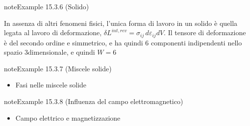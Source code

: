 \documentclass[letterpaper,10pt,italian]{jupyterBook}
\begin{document}
\label{ch/thermodynamics/principles-gibbs-phase-rule:example-9}
\begin{sphinxadmonition}{note}{Example 15.3.6 (Solido)}



\sphinxAtStartPar
In assenza di altri fenomeni fisici, l’unica forma di lavoro in un solido è quella legata al lavoro di deformazione, \(\delta L^{int,rev} = \sigma_{ij} \, d \varepsilon_{ij} dV\). Il tensore di deformazione è del secondo ordine e simmetrico, e ha quindi 6 componenti indipendenti nello spazio 3\sphinxhyphen{}dimensionale, e quindi \(W=6\)
\end{sphinxadmonition}
\label{ch/thermodynamics/principles-gibbs-phase-rule:example-10}
\begin{sphinxadmonition}{note}{Example 15.3.7 (Miscele solide)}


\begin{itemize}
\item {} 
\sphinxAtStartPar
Fasi nelle miscele solide 

\end{itemize}
\end{sphinxadmonition}
\label{ch/thermodynamics/principles-gibbs-phase-rule:example-11}
\begin{sphinxadmonition}{note}{Example 15.3.8 (Influenza del campo elettromagnetico)}


\begin{itemize}
\item {} 
\sphinxAtStartPar
Campo elettrico e magnetizzazione 

\end{itemize}
\end{sphinxadmonition}
\end{document}

